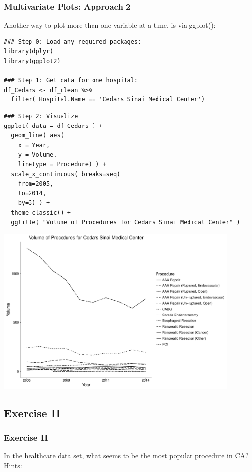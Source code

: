 \begin{frame}
 \frametitle{Multivariate Plots: Approach 2}

Another way to plot more than one variable at a time, is via \ttfamily ggplot()\normalfont :

    \begin{lstlisting}
### Step 0: Load any required packages:
library(dplyr)
library(ggplot2)

### Step 1: Get data for one hospital:
df_Cedars <- df_clean %>%
  filter( Hospital.Name == 'Cedars Sinai Medical Center')
   \end{lstlisting}

\newpage
    \begin{lstlisting}
### Step 2: Visualize
ggplot( data = df_Cedars ) + 
  geom_line( aes(
    x = Year, 
    y = Volume, 
    linetype = Procedure) ) +
  scale_x_continuous( breaks=seq(
    from=2005, 
    to=2014, 
    by=3) ) +
  theme_classic() +
  ggtitle( "Volume of Procedures for Cedars Sinai Medical Center" )
   \end{lstlisting}

\newpage
       \begin{center}
         \includegraphics[width=0.9\textwidth]{images/timeseries_Cedars}
        \end{center}
\end{frame}

\subsection{Exercise II}
\begin{frame}[fragile]
	\frametitle{Exercise II}
	In the healthcare data set, what seems to be the most popular procedure in CA?\\
  \vspace{10pt}
  \noindent Hints: \small


    \normalsize
\end{frame}
